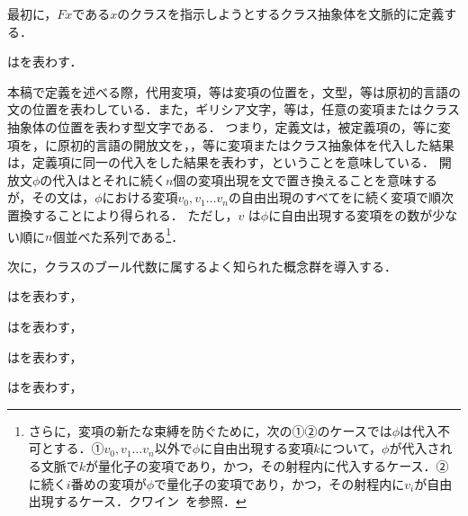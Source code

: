 最初に，$Fx$である$x$のクラスを指示しようとするクラス抽象体を文脈的に定義する．

\begin{df}
\label{df:クラス抽象A}
はを表わす．
\end{df}

\noindent 本稿で定義を述べる際，代用変項，等は変項の位置を，文型，等は原初的言語の文の位置を表わしている．また，ギリシア文字\kagi{$\alpha$}，\kagi{$\beta$}等は，任意の変項またはクラス抽象体の位置を表わす型文字である．
つまり，定義文は，被定義項の，等に変項を，に原初的言語の開放文を，\kagi{$\alpha$}，\kagi{$\beta$}等に変項またはクラス抽象体を代入した結果は，定義項に同一の代入をした結果を表わす，ということを意味している．
開放文$\phi$の代入はとそれに続く$n$個の変項出現を文で置き換えることを意味するが，その文は，$\phi$における変項$v_0,v_1\dots v_n$の自由出現のすべてをに続く変項で順次置換することにより得られる． ただし，$v$ は$\phi$に自由出現する変項をの数が少ない順に$n$個並べた系列である\footnote{
    さらに，変項の新たな束縛を防ぐために，次の①②のケースでは$\phi$は代入不可とする．①$v_0,v_1\dots v_n$以外で$\phi$に自由出現する変項$k$について，$\phi$が代入される文脈で$k$が量化子の変項であり，かつ，その射程内に代入するケース．②に続く$i$番めの変項が$\phi$で量化子の変項であり，かつ，その射程内に$v_i$が自由出現するケース．クワイン~\cite[pp.\,154--156]{クワインb}を参照．
}．

次に，クラスのブール代数に属するよく知られた概念群を導入する．

\begin{df}[部分クラス]
\label{df:部分クラス}
\kagi{$
    \alpha\subseteq\beta
$}はを表わす，
\end{df}

\begin{df}[真部分クラス]
\label{df:真部分クラス}
\kagi{$
    \alpha\subset\beta
$}は\kagi{$
    \alpha\subseteq\beta\not\subseteq\alpha
$}を表わす，
\end{df}

\begin{df}[合併]
\label{df:合併}
\kagi{$
    \alpha \cup \beta
$}はを表わす，
\end{df}

\begin{df}[共通部分]
\label{df:共通部分}
\kagi{$
    \alpha \cap \beta
$}はを表わす，
\end{df}

